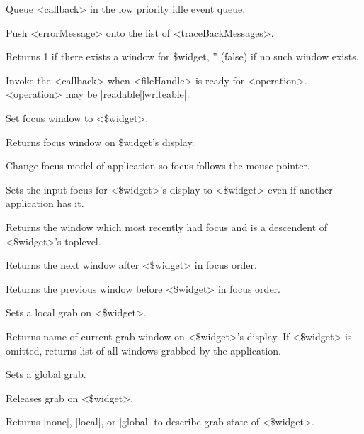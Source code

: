 \begin{enum}{1cm}
Queue <callback> in the low priority idle event queue.

Push <errorMessage> onto the list of <traceBackMessages>.

Returns 1 if there exists a window for \$widget, '' (false) if no such window exists. 

Invoke the <callback> when <fileHandle> is ready for <operation>.  <operation>
may be |readable|\||writeable|.

Set focus window to <\$widget>.

Returns focus window on \$widget's display.

Change focus model of application so focus follows the mouse pointer.

Sets the input focus for <\$widget>'s display to <\$widget>
even if another application has it.

Returns the window which most recently had focus and is a descendent
of <\$widget>'s toplevel.

Returns the next window after <\$widget> in focus order.

Returns the previous window before <\$widget> in focus order.

Sets a local grab on <\$widget>.

Returns name of current grab window on <\$widget>'s display. If <\$widget> is
omitted, returns list of all windows grabbed by the application.

Sets a global grab.

Releases grab on <\$widget>.

Returns |none|, |local|, or |global| to describe grab state of <\$widget>.


\end{enum}

